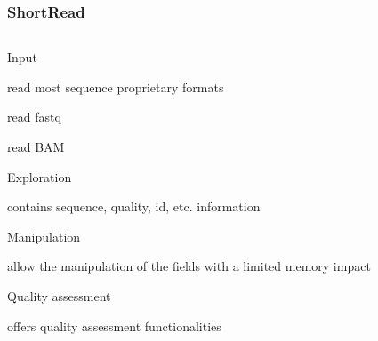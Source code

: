 \documentclass{beamer}
\begin{document}

\begin{frame}
\frametitle{ShortRead}
\begin{column}{1\textwidth}
  \bit
      \item Input
        \bit
            \item read most sequence proprietary formats
            \item read fastq
            \item read BAM
        \eit
      \item Exploration
        \bit
            \item contains sequence, quality, id, etc. information
        \eit
      \item Manipulation
        \bit
            \item allow the manipulation of the fields with a limited memory impact
        \eit
      \item Quality assessment
        \bit
            \item offers quality assessment functionalities
        \eit
  \eit
  \end{column}
\end{frame}

\end{document}
